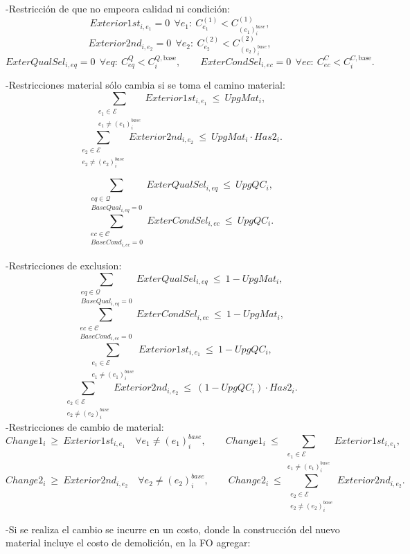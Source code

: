 \begin{itemize}
-Restricción de que no empeora calidad ni condición:
\[
Exterior1st_{i,e_1}=0\ \ \forall e_1:\ C^{(1)}_{e_1} < C^{(1)}_{(e_1)^{base}_i},
\]
\[
Exterior2nd_{i,e_2}=0\ \ \forall e_2:\ C^{(2)}_{e_2} < C^{(2)}_{(e_2)^{base}_i},
\]
\[
ExterQualSel_{i,eq}=0\ \ \forall eq:\ C^Q_{eq} < C^{Q,\text{base}}_i,\qquad
ExterCondSel_{i,ec}=0\ \ \forall ec:\ C^C_{ec} < C^{C,\text{base}}_i.
\]

-Restricciones material sólo cambia si se toma el camino material:
\[
\sum_{\substack{e_1\in\mathcal{E}\\ e_1\neq (e_1)^{base}_i}} Exterior1st_{i,e_1} \ \le\ UpgMat_i,
\]
\[
\sum_{\substack{e_2\in\mathcal{E}\\ e_2\neq (e_2)^{base}_i}} Exterior2nd_{i,e_2} \ \le\ UpgMat_i \cdot Has2_i.
\]

\[
\sum_{\substack{eq\in\mathcal{Q}\\ BaseQual_{i,eq}=0}} ExterQualSel_{i,eq} \ \le\ UpgQC_i,
\]
\[
\sum_{\substack{ec\in\mathcal{C}\\ BaseCond_{i,ec}=0}} ExterCondSel_{i,ec} \ \le\ UpgQC_i.
\]

-Restricciones de exclusion:
\[
\sum_{\substack{eq\in\mathcal{Q}\\ BaseQual_{i,eq}=0}} ExterQualSel_{i,eq} \ \le\ 1 - UpgMat_i,
\]
\[
\sum_{\substack{ec\in\mathcal{C}\\ BaseCond_{i,ec}=0}} ExterCondSel_{i,ec} \ \le\ 1 - UpgMat_i,
\]
\[
\sum_{\substack{e_1\in\mathcal{E}\\ e_1\neq (e_1)^{base}_i}} Exterior1st_{i,e_1} \ \le\ 1 - UpgQC_i,
\]
\[
\sum_{\substack{e_2\in\mathcal{E}\\ e_2\neq (e_2)^{base}_i}} Exterior2nd_{i,e_2} \ \le\ (1 - UpgQC_i)\cdot Has2_i.
\]
-Restricciones de cambio de material:
\[
Change1_i \ \ge\ Exterior1st_{i,e_1} \quad \forall e_1\neq (e_1)^{base}_i,\qquad
Change1_i \ \le\ \sum_{\substack{e_1\in\mathcal{E}\\ e_1\neq (e_1)^{base}_i}} Exterior1st_{i,e_1},
\]
\[
Change2_i \ \ge\ Exterior2nd_{i,e_2} \quad \forall e_2\neq (e_2)^{base}_i,\qquad
Change2_i \ \le\ \sum_{\substack{e_2\in\mathcal{E}\\ e_2\neq (e_2)^{base}_i}} Exterior2nd_{i,e_2}.
\]

-Si se realiza el cambio se incurre en un costo, donde la construcción del nuevo material incluye el costo de demolición, en la FO agregar:\\


\end{itemize}
